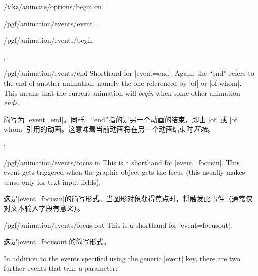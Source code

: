 \begin{key}{/tikz/animate/options/begin on=}
\begin{key}{/pgf/animation/events/event=}
\begin{key}{/pgf/animation/events/begin}
\begin{codeexample}[width=2cm,preamble={\usetikzlibrary{animations}}]
\tikz {};
\end{codeexample}
        \end{key}
        \begin{key}{/pgf/animation/events/end}
            Shorthand for |event=end|. Again, the ``end'' refers to the end of
            another animation, namely the one referenced by |of| or |of whom|.
            This means that the current animation will \emph{begin} when some
            other animation \emph{ends}.
            
            简写为 |event=end|。同样，“end”指的是另一个动画的结束，即由 |of| 或 |of whom| 引用的动画。这意味着当前动画将在另一个动画结束时\emph{开始}。


\begin{codeexample}[width=2cm,preamble={\usetikzlibrary{animations}}]
\tikz {};
\end{codeexample}
        \end{key}
        \begin{key}{/pgf/animation/events/focus in}
            This is a shorthand for |event=focusin|. This event gets triggered
            when the graphic object gets the focus (this usually makes sense
            only for text input fields).

            这是|event=focusin|的简写形式。当图形对象获得焦点时，将触发此事件（通常仅对文本输入字段有意义）。
        \end{key}
        \begin{key}{/pgf/animation/events/focus out}
            This is a shorthand for |event=focusout|.

            这是|event=focusout|的简写形式。
        \end{key}
    \end{key}

    In addition to the events specified using the generic |event| key, there
    are two further events that take a parameter:
    

\end{key}
